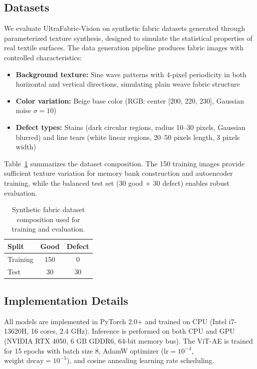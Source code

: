 \documentclass[journal]{IEEEtran}
\begin{document}
\subsection{Datasets}

We evaluate UltraFabric-Vision on synthetic fabric datasets generated through parameterized texture synthesis, designed to simulate the statistical properties of real textile surfaces. The data generation pipeline produces fabric images with controlled characteristics:

\begin{itemize}[nosep]
    \item \textbf{Background texture:} Sine wave patterns with 4-pixel periodicity in both horizontal and vertical directions, simulating plain weave fabric structure
    \item \textbf{Color variation:} Beige base color (RGB: center [200, 220, 230], Gaussian noise $\sigma=10$)
    \item \textbf{Defect types:} Stains (dark circular regions, radius 10--30 pixels, Gaussian blurred) and line tears (white linear regions, 20--50 pixels length, 3 pixels width)
\end{itemize}

Table~\ref{tab:dataset} summarizes the dataset composition. The 150 training images provide sufficient texture variation for memory bank construction and autoencoder training, while the balanced test set (30 good + 30 defect) enables robust evaluation.

\begin{table}[t]
\centering
\caption{Synthetic fabric dataset composition used for training and evaluation.}
\label{tab:dataset}
\begin{tabular}{lcc}
\toprule
\textbf{Split} & \textbf{Good} & \textbf{Defect} \\
\midrule
Training & 150 & 0 \\
Test & 30 & 30 \\
\bottomrule
\end{tabular}
\end{table}

\subsection{Implementation Details}

All models are implemented in PyTorch 2.0+ and trained on CPU (Intel i7-13620H, 16 cores, 2.4 GHz). Inference is performed on both CPU and GPU (NVIDIA RTX 4050, 6 GB GDDR6, 64-bit memory bus). The ViT-AE is trained for 15 epochs with batch size 8, AdamW optimizer ($\text{lr}=10^{-4}$, $\text{weight decay}=10^{-5}$), and cosine annealing learning rate scheduling.
\end{document}
